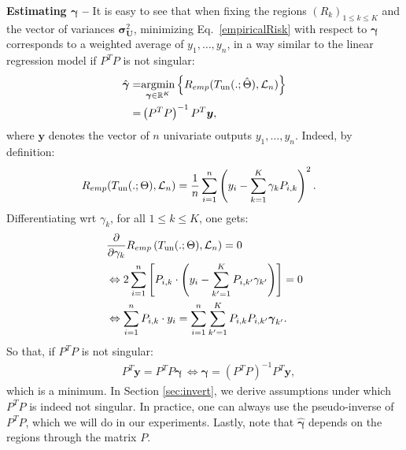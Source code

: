 \documentclass[twoside,11pt]{article}
\begin{document}
\noindent \textbf{Estimating $\boldsymbol{\gamma}$ --} It is easy to see that when fixing the regions $(R_k)_{1\leq k \leq K}$ and the vector of variances $\boldsymbol{\sigma}_{\boldsymbol{U}}^2 $, minimizing Eq.~\eqref{empiricalRisk} with respect to $\boldsymbol{\gamma}$ corresponds to a weighted average of $y_1,\ldots, y_n$, in a way similar to the linear regression model if $P^T P$ is not singular:
%
\begin{align}
    \label{notre_estimateur_gamma_k}
       \hat{\boldsymbol{\gamma}} =& \underset{\boldsymbol{\gamma} \in \mathbb{R}^K}{\operatorname{argmin}} \left\{ R_{emp}(T_{\text{un}}(.;\hat{\Theta}), {\cal L}_n) \right\} \\
       =& \left(P^T P\right)^{-1}  P^T  \boldsymbol{y},\nonumber  
\end{align}
%
where $\boldsymbol{y}$ denotes the vector of $n$ univariate outputs $y_1,\ldots, y_n$.
Indeed, by definition:
%
\begin{align*}
    &R_{emp}(T_{\text{un}}(.;{\Theta}), {\cal L}_n)
    = 
    \frac{1}{n} \sum_{i=1}^n \left(y_i - \sum_{k=1}^K \gamma_k {P}_{i,k}\right)^2.
\end{align*}
%    
Differentiating wrt $\gamma_k$, for all $1\leq k \leq K$, one gets:
%
\begin{align*}
   &\frac{\partial}{\partial{\gamma}_{k}} R_{emp}\left( T_{\text{un}}(.;{\Theta}), {\cal L}_n\right) = 0 \\
    &\Leftrightarrow
   2 \sum_{i=1}^n \left[    
    P_{i,k} \cdot \left( y_i -  \sum_{k'=1}^K  P_{i,k'}  {\gamma}_{k'} \right)\right] = 0\\
   & \Leftrightarrow
   \sum_{i=1}^n 
        P_{i,k} \cdot   y_i
       =   \sum_{i=1}^n   \sum_{k'=1}^K    P_{i,k}  P_{i,k'}  \boldsymbol{\gamma}_{k'}.
\end{align*}
%
So that, if ${P}^T P$ is not singular:
%
\begin{align*}
& P^T   \boldsymbol{y}
       =  {P}^T   P\boldsymbol{\gamma} \, \Leftrightarrow \boldsymbol{\gamma} = \left(P^T P\right)^{-1}  P^T  \boldsymbol{y},
\end{align*}
which is a minimum. In Section \ref{sec:invert}, we derive assumptions under which ${P}^T P$ is indeed not singular. In practice, one can always use the pseudo-inverse of ${P}^T P$, which we will do in our experiments. Lastly, note that $\hat{\boldsymbol{\gamma}}$ depends on the regions through the matrix $P$. 
\end{document}
